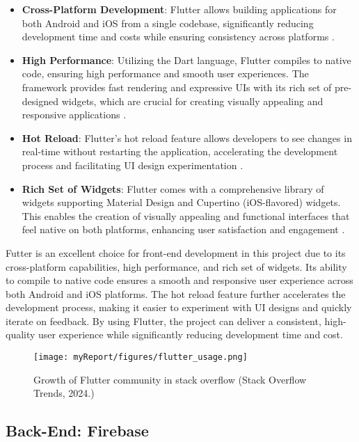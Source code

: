 \begin{itemize}
    \item \textbf{Cross-Platform Development}: Flutter allows building applications for both Android and iOS from a single codebase, significantly reducing development time and costs while ensuring consistency across platforms \cite{flutter2023}.
    \item \textbf{High Performance}: Utilizing the Dart language, Flutter compiles to native code, ensuring high performance and smooth user experiences. The framework provides fast rendering and expressive UIs with its rich set of pre-designed widgets, which are crucial for creating visually appealing and responsive applications \cite{flutter_performance}.
    \item \textbf{Hot Reload}: Flutter's hot reload feature allows developers to see changes in real-time without restarting the application, accelerating the development process and facilitating UI design experimentation \cite{flutter_hot_reload}.
    \item \textbf{Rich Set of Widgets}: Flutter comes with a comprehensive library of widgets supporting Material Design and Cupertino (iOS-flavored) widgets. This enables the creation of visually appealing and functional interfaces that feel native on both platforms, enhancing user satisfaction and engagement \cite{flutter_widgets}.
\end{itemize}
Futter is an excellent choice for front-end development in this project due to its cross-platform capabilities, high performance, and rich set of widgets. Its ability to compile to native code ensures a smooth and responsive user experience across both Android and iOS platforms. The hot reload feature further accelerates the development process, making it easier to experiment with UI designs and quickly iterate on feedback. By using Flutter, the project can deliver a consistent, high-quality user experience while significantly reducing development time and cost.

\begin{figure}[ht]
        \texttt{[image: myReport/figures/flutter\_usage.png]}
        \caption{Growth of Flutter community in stack overflow (Stack Overflow Trends, 2024.)}
\end{figure}

\subsection{Back-End: Firebase}

